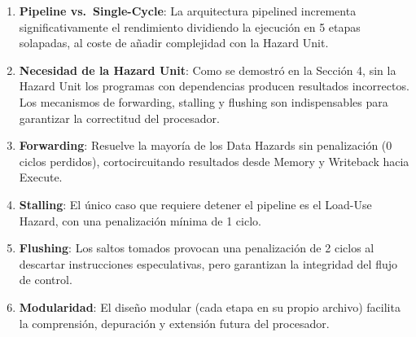 \documentclass[12pt, a4paper]{article}
\begin{document}
\begin{enumerate}
  \item \textbf{Pipeline vs.\ Single-Cycle}: La arquitectura pipelined incrementa significativamente el rendimiento dividiendo la ejecución en 5 etapas solapadas, al coste de añadir complejidad con la Hazard Unit.
  \item \textbf{Necesidad de la Hazard Unit}: Como se demostró en la Sección 4, sin la Hazard Unit los programas con dependencias producen resultados incorrectos. Los mecanismos de forwarding, stalling y flushing son indispensables para garantizar la correctitud del procesador.
  \item \textbf{Forwarding}: Resuelve la mayoría de los Data Hazards sin penalización (0 ciclos perdidos), cortocircuitando resultados desde Memory y Writeback hacia Execute.
  \item \textbf{Stalling}: El único caso que requiere detener el pipeline es el Load-Use Hazard, con una penalización mínima de 1 ciclo.
  \item \textbf{Flushing}: Los saltos tomados provocan una penalización de 2 ciclos al descartar instrucciones especulativas, pero garantizan la integridad del flujo de control.
  \item \textbf{Modularidad}: El diseño modular (cada etapa en su propio archivo) facilita la comprensión, depuración y extensión futura del procesador.
\end{enumerate}
\end{document}
